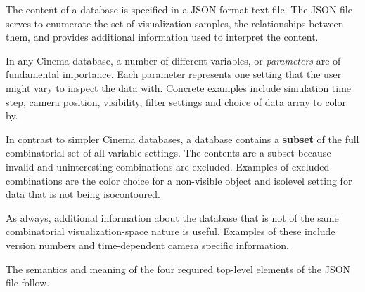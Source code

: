 \label{sec:implementation}

The content of a database is specified in a JSON format text file. The JSON file serves to enumerate the set of visualization samples, the relationships between them, and provides additional information used to interpret the content.

In any Cinema database, a number of different variables, or \textit{parameters} are of fundamental importance. Each parameter represents one setting that the user might vary to inspect the data with. Concrete examples include simulation time step, camera position, visibility, filter settings and choice of data array to color by.

In contrast to simpler Cinema databases, a \chaplin database contains a \textbf{subset} of the full combinatorial set of all variable settings. The contents are a subset because invalid and uninteresting combinations are excluded. Examples of excluded combinations are the color choice for a non-visible object and isolevel setting for data that is not being isocontoured.

As always, additional information about the database that is not of the same combinatorial visualization-space nature is useful. Examples of these include version numbers and time-dependent camera specific information.

The semantics and meaning of the four required top-level elements of the JSON file follow.
